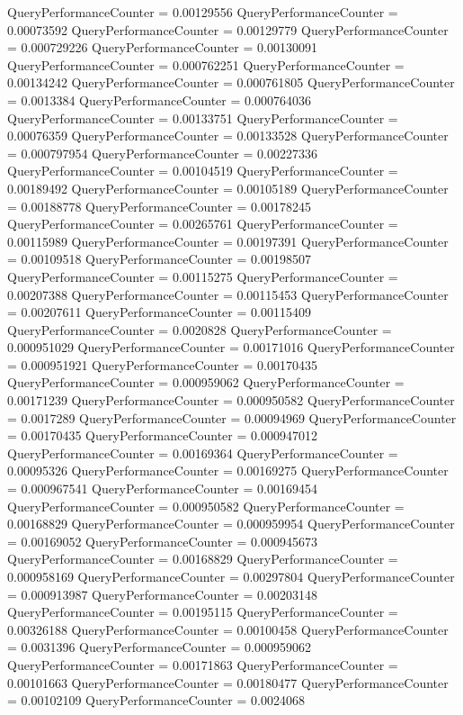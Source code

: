\documentclass[9pt]{article}
\theoremstyle{plain}
\theoremstyle{definition}
\theoremstyle{remark}
\numberwithin{equation}{section}
\begin{document}
QueryPerformanceCounter  =  0.00129556
QueryPerformanceCounter  =  0.00073592
QueryPerformanceCounter  =  0.00129779
QueryPerformanceCounter  =  0.000729226
QueryPerformanceCounter  =  0.00130091
QueryPerformanceCounter  =  0.000762251
QueryPerformanceCounter  =  0.00134242
QueryPerformanceCounter  =  0.000761805
QueryPerformanceCounter  =  0.0013384
QueryPerformanceCounter  =  0.000764036
QueryPerformanceCounter  =  0.00133751
QueryPerformanceCounter  =  0.00076359
QueryPerformanceCounter  =  0.00133528
QueryPerformanceCounter  =  0.000797954
QueryPerformanceCounter  =  0.00227336
QueryPerformanceCounter  =  0.00104519
QueryPerformanceCounter  =  0.00189492
QueryPerformanceCounter  =  0.00105189
QueryPerformanceCounter  =  0.00188778
QueryPerformanceCounter  =  0.00178245
QueryPerformanceCounter  =  0.00265761
QueryPerformanceCounter  =  0.00115989
QueryPerformanceCounter  =  0.00197391
QueryPerformanceCounter  =  0.00109518
QueryPerformanceCounter  =  0.00198507
QueryPerformanceCounter  =  0.00115275
QueryPerformanceCounter  =  0.00207388
QueryPerformanceCounter  =  0.00115453
QueryPerformanceCounter  =  0.00207611
QueryPerformanceCounter  =  0.00115409
QueryPerformanceCounter  =  0.0020828
QueryPerformanceCounter  =  0.000951029
QueryPerformanceCounter  =  0.00171016
QueryPerformanceCounter  =  0.000951921
QueryPerformanceCounter  =  0.00170435
QueryPerformanceCounter  =  0.000959062
QueryPerformanceCounter  =  0.00171239
QueryPerformanceCounter  =  0.000950582
QueryPerformanceCounter  =  0.0017289
QueryPerformanceCounter  =  0.00094969
QueryPerformanceCounter  =  0.00170435
QueryPerformanceCounter  =  0.000947012
QueryPerformanceCounter  =  0.00169364
QueryPerformanceCounter  =  0.00095326
QueryPerformanceCounter  =  0.00169275
QueryPerformanceCounter  =  0.000967541
QueryPerformanceCounter  =  0.00169454
QueryPerformanceCounter  =  0.000950582
QueryPerformanceCounter  =  0.00168829
QueryPerformanceCounter  =  0.000959954
QueryPerformanceCounter  =  0.00169052
QueryPerformanceCounter  =  0.000945673
QueryPerformanceCounter  =  0.00168829
QueryPerformanceCounter  =  0.000958169
QueryPerformanceCounter  =  0.00297804
QueryPerformanceCounter  =  0.000913987
QueryPerformanceCounter  =  0.00203148
QueryPerformanceCounter  =  0.00195115
QueryPerformanceCounter  =  0.00326188
QueryPerformanceCounter  =  0.00100458
QueryPerformanceCounter  =  0.0031396
QueryPerformanceCounter  =  0.000959062
QueryPerformanceCounter  =  0.00171863
QueryPerformanceCounter  =  0.00101663
QueryPerformanceCounter  =  0.00180477
QueryPerformanceCounter  =  0.00102109
QueryPerformanceCounter  =  0.0024068
\end{document}
